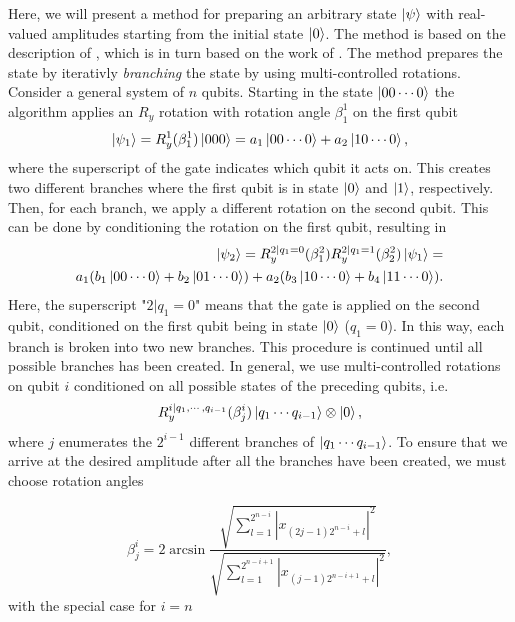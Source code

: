 Here, we will present a method for preparing an arbitrary state $\ket{\psi}$ with real-valued amplitudes starting from the initial state $\ket{0}$. The method is based on the description of \cite{SupervisedwquantumComputers}, which is in turn based on the work of \cite{Mottonen}. The method prepares the state by iterativly \emph{branching} the state by using multi-controlled rotations. Consider a general system of $n$ qubits. Starting in the state $\ket{00\cdots0}$ the algorithm applies an $R_y$ rotation with rotation angle $\beta^1_1$ on the first qubit
\begin{equation}
    \ket{\psi_1} = R_y^1(\beta^1_1)\ket{000} = a_1\ket{00\cdots0} + a_2\ket{10\cdots0},
\end{equation}
where the superscript of the gate indicates which qubit it acts on. 
This creates two different branches where the first qubit is in state $\ket{0}$ and $\ket{1}$, respectively. Then, for each branch, we apply a different rotation on the second qubit. This can be done by conditioning the rotation on the first qubit, resulting in  
\begin{equation}
\begin{aligned}
    \ket{\psi_2} = R_y^{2|q_1 = 0}(\beta^2_1)R_y^{2|q_1 = 1}(\beta^2_2)\ket{\psi_1} =\\ a_1(b_1\ket{00\cdots0} + b_2\ket{01\cdots0}) + a_2(b_3\ket{10\cdots0} + b_4\ket{11\cdots0}).
\end{aligned}
\end{equation}
Here, the superscript "$2|q_1=0$" means that the gate is applied on the second qubit, conditioned on the first qubit being in state $\ket{0}$ ($q_1=0$). 
In this way, each branch is broken into two new branches. This procedure is continued until all possible branches has been created. In general, we use multi-controlled rotations on qubit $i$ conditioned on all possible states of the preceding qubits, i.e.
\begin{equation}
    R_y^{i|q_1,\cdots,q_{i-1}}(\beta^i_j)\ket{q_1 \cdots q_{i-1}}\otimes \ket{0},
\end{equation}
where $j$ enumerates the $2^{i-1}$ different branches of $\ket{q_1 \cdots q_{i-1}}$. To ensure that we arrive at the desired amplitude after all the branches have been created, we must choose rotation angles

\begin{equation}
    \beta^{i}_j = 2\arcsin{
    \frac{\sqrt{\sum_{l=1}^{2^{n-i}} |x_{(2j - 1)2^{n-i} + l}|^2}}
    {\sqrt{\sum_{l=1}^{2^{n-i+1}} |x_{(j-1)2^{n-i+1}  + l}|^2}}
    },
\end{equation}
with the special case for $i=n$

